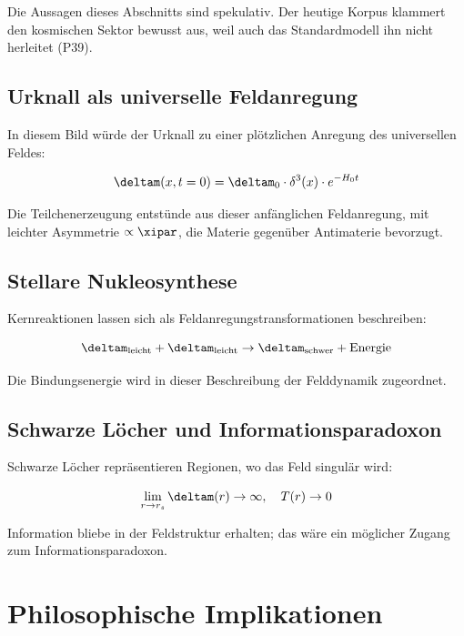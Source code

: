 	Die Aussagen dieses Abschnitts sind spekulativ. Der heutige Korpus klammert den kosmischen Sektor bewusst aus, weil auch das Standardmodell ihn nicht herleitet (P39).
	
	\subsection{Urknall als universelle Feldanregung}
	
	In diesem Bild würde der Urknall zu einer plötzlichen Anregung des universellen Feldes:
	
	\begin{equation}
		\deltam(x,t=0) = \deltam_0 \cdot \delta^3(x) \cdot e^{-H_0 t}
		\label{eq:big_bang_field}
	\end{equation}
	
	Die Teilchenerzeugung entstünde aus dieser anfänglichen Feldanregung, mit leichter Asymmetrie $\propto \xipar$, die Materie gegenüber Antimaterie bevorzugt.
	
	\subsection{Stellare Nukleosynthese}
	
	Kernreaktionen lassen sich als Feldanregungstransformationen beschreiben:
	
	\begin{equation}
		\deltam_{\text{leicht}} + \deltam_{\text{leicht}} \rightarrow \deltam_{\text{schwer}} + \text{Energie}
		\label{eq:nucleosynthesis_field}
	\end{equation}
	
	Die Bindungsenergie wird in dieser Beschreibung der Felddynamik zugeordnet.
	
	\subsection{Schwarze Löcher und Informationsparadoxon}
	
	Schwarze Löcher repräsentieren Regionen, wo das Feld singulär wird:
	
	\begin{equation}
		\lim_{r \to r_s} \deltam(r) \to \infty, \quad T(r) \to 0
		\label{eq:black_hole_singularity}
	\end{equation}
	
	Information bliebe in der Feldstruktur erhalten; das wäre ein möglicher Zugang zum Informationsparadoxon.
	
	\section{Philosophische Implikationen}
	
